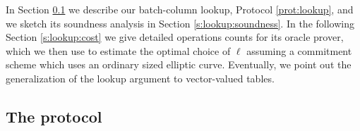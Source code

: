 \documentclass[11pt]{article}
\theoremstyle{definition}
\theoremstyle{definition}
\begin{document}
In Section \ref{s:lookup:small} we describe our batch-column lookup, Protocol \ref{prot:lookup}, and we sketch its soundness analysis in Section \ref{s:lookup:soundness}. 
In the following Section \ref{s:lookup:cost} we give detailed operations counts for its oracle prover, which we then use to estimate the optimal choice of $\ell$ assuming a commitment scheme which uses an ordinary sized elliptic curve\footnotemark.
Eventually, we point out the generalization of the lookup argument to vector-valued tables.

%
%

\subsection{The protocol}
\label{s:lookup:small}
\end{document}
